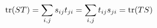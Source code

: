 \documentclass[preview]{standalone}
\begin{document}
\begin{align*}
\special{dvisvgm:raw <g id='unique000'>}\operatorname{tr}(ST)=\sum_{i,j}s_{ij}t_{ji}=\sum_{i,j}t_{ij}s_{ji}=\operatorname{tr}(TS)\special{dvisvgm:raw </g>}
\end{align*}
\end{document}
